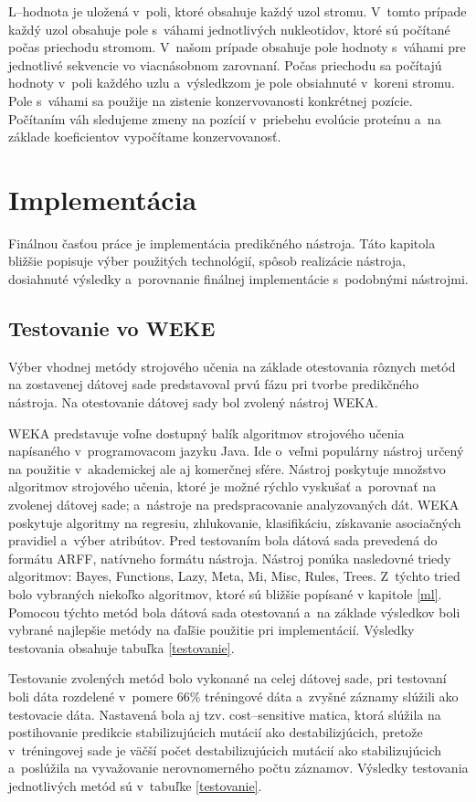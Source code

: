 L--hodnota je uložená v~poli, ktoré obsahuje každý uzol stromu. V~tomto prípade každý uzol obsahuje pole s~váhami jednotlivých nukleotidov, ktoré sú počítané počas priechodu stromom. V~našom prípade obsahuje pole hodnoty s~váhami pre jednotlivé sekvencie vo viacnásobnom zarovnaní. Počas priechodu sa počítajú hodnoty v~poli každého uzlu a~výsledkzom je pole obsiahnuté v~koreni stromu. Pole s~váhami sa použije na zistenie konzervovanosti konkrétnej pozície. Počítaním váh sledujeme zmeny na pozícií v~priebehu evolúcie proteínu a~na základe koeficientov vypočítame konzervovanosť.

\chapter{Implementácia}
Finálnou časťou práce je implementácia predikčného nástroja. Táto kapitola bližšie popisuje výber použitých technológií, spôsob realizácie nástroja, dosiahnuté výsledky a~porovnanie finálnej implementácie s~podobnými nástrojmi.

\section{Testovanie vo WEKE}
\label{wekatest}
Výber vhodnej metódy strojového učenia na základe otestovania rôznych metód na zostavenej dátovej sade predstavoval prvú fázu pri tvorbe predikčného nástroja. Na otestovanie dátovej sady bol zvolený nástroj WEKA.

WEKA \cite{weka} predstavuje voľne dostupný balík algoritmov strojového učenia napísaného v~programovacom jazyku Java. Ide o~veľmi populárny nástroj určený na použitie v~akademickej ale aj komerčnej sfére. Nástroj poskytuje množstvo algoritmov strojového učenia, ktoré je možné rýchlo vyskušať a~porovnať na zvolenej dátovej sade; a~nástroje na predspracovanie analyzovaných dát. WEKA poskytuje algoritmy na regresiu, zhlukovanie, klasifikáciu, získavanie asociačných pravidiel a~výber atribútov.
Pred testovaním bola dátová sada prevedená do formátu ARFF, natívneho formátu nástroja. Nástroj ponúka nasledovné triedy algoritmov: Bayes, Functions, Lazy, Meta, Mi, Misc, Rules, Trees. Z~týchto tried bolo vybraných niekoľko algoritmov, ktoré sú bližšie popísané v kapitole \ref{ml}. Pomocou týchto metód bola dátová sada otestovaná a~na základe výsledkov boli vybrané najlepšie metódy na ďaľšie použitie pri implementácií. Výsledky testovania obsahuje tabuľka \ref{testovanie}.

Testovanie zvolených metód bolo vykonané na celej dátovej sade, pri testovaní boli dáta rozdelené v~pomere 66\% tréningové dáta a~zvyšné záznamy slúžili ako testovacie dáta. Nastavená bola aj tzv. cost--sensitive matica, ktorá slúžila na postihovanie predikcie stabilizujúcich mutácií ako destabilizjúcich, pretože v~tréningovej sade je väčší počet destabilizujúcich mutácií ako stabilizujúcich a~poslúžila na vyvažovanie nerovnomerného počtu záznamov. Výsledky testovania jednotlivých metód sú v~tabuľke \ref{testovanie}. 

